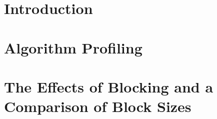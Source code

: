 \section{Introduction}
\label{software:Introduction}


\section{Algorithm Profiling}
\label{software:algorithmProfiling}


\section{The Effects of Blocking and a Comparison of Block Sizes}
\label{software:blockSize}

